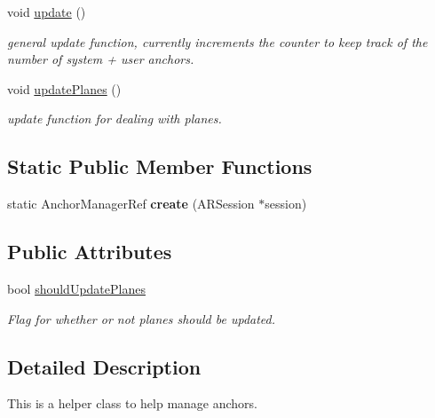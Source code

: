 \begin{DoxyCompactItemize}
void \hyperlink{class_a_r_core_1_1_a_r_anchor_manager_af4b19656d608761d25661d6720a4c2f3}{update} ()
\begin{DoxyCompactList}\small\item\em general update function, currently increments the counter to keep track of the number of system + user anchors. \end{DoxyCompactList}\item 
\mbox{\label{class_a_r_core_1_1_a_r_anchor_manager_aa35c3487e0ba5980ff6b2fb43414bd57}} 
void \hyperlink{class_a_r_core_1_1_a_r_anchor_manager_aa35c3487e0ba5980ff6b2fb43414bd57}{update\+Planes} ()
\begin{DoxyCompactList}\small\item\em update function for dealing with planes. \end{DoxyCompactList}\end{DoxyCompactItemize}
\subsection*{Static Public Member Functions}
\begin{DoxyCompactItemize}
\item 
\mbox{\label{class_a_r_core_1_1_a_r_anchor_manager_ab1293c2f5911e273573b1df3643fd086}} 
static Anchor\+Manager\+Ref {\bfseries create} (A\+R\+Session $\ast$session)
\end{DoxyCompactItemize}
\subsection*{Public Attributes}
\begin{DoxyCompactItemize}
\item 
\mbox{\label{class_a_r_core_1_1_a_r_anchor_manager_af67de0a611ff8a2786891eabb0ca571f}} 
bool \hyperlink{class_a_r_core_1_1_a_r_anchor_manager_af67de0a611ff8a2786891eabb0ca571f}{should\+Update\+Planes}
\begin{DoxyCompactList}\small\item\em Flag for whether or not planes should be updated. \end{DoxyCompactList}\end{DoxyCompactItemize}


\subsection{Detailed Description}
This is a helper class to help manage anchors. 


